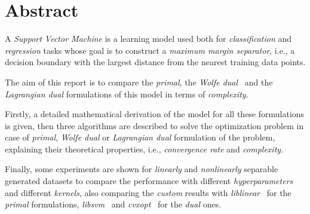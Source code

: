 \section{Abstract}

A \emph{Support Vector Machine} is a learning model used both for \emph{classification} and \emph{regression} tasks whose goal is to construct a \emph{maximum margin separator}, i.e., a decision boundary with the largest distance from the nearest training data points.

The aim of this report is to compare the \emph{primal}, the \emph{Wolfe dual}~\cite{fletcher2009support} and the \emph{Lagrangian dual} formulations of this model in terms of \emph{complexity}.

Firstly, a detailed mathematical derivation of the model for all these formulations is given, then three algorithms are described to solve the optimization problem in case of \emph{primal}, \emph{Wolfe dual} or \emph{Lagrangian dual} formulation of the problem, explaining their theoretical properties, i.e., \emph{convergence rate} and \emph{complexity}.

Finally, some experiments are shown for \emph{linearly} and \emph{nonlinearly} separable generated datasets to compare the performance with different \emph{hyperparameters} and different \emph{kernels}, also comparing the \emph{custom} results with \emph{liblinear}~\cite{fan2008liblinear} for the \emph{primal} formulations, \emph{libsvm}~\cite{chang2011libsvm} and \emph{cvxopt}~\cite{vandenberghe2010cvxopt} for the \emph{dual} ones.
